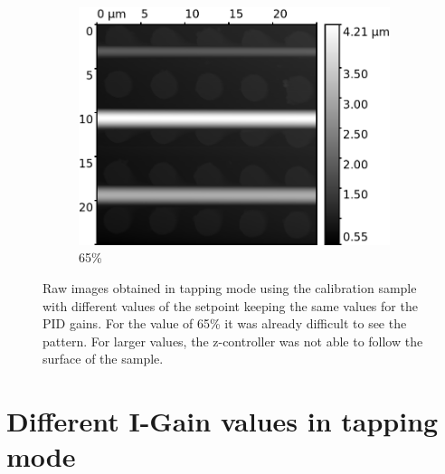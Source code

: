 \documentclass[11pt,a4paper]{article}
\begin{document}
\begin{appendices}
\begin{figure}[H]
\begin{subfigure}[b]{0.48\textwidth}
\includegraphics[width=\textwidth]{tapping_mode_setpoint_65}
\caption{65\%}
\end{subfigure}
\caption{Raw images obtained in tapping mode using the calibration sample with different values of the setpoint keeping the same values for the PID gains. For the value of 65\% it was already difficult to see the pattern. For larger values, the z-controller was not able to follow the surface of the sample.}
\end{figure}

\section{Different I-Gain values in tapping mode}\label{app:tapping_mode_Igain}


\end{appendices}
\end{document}
